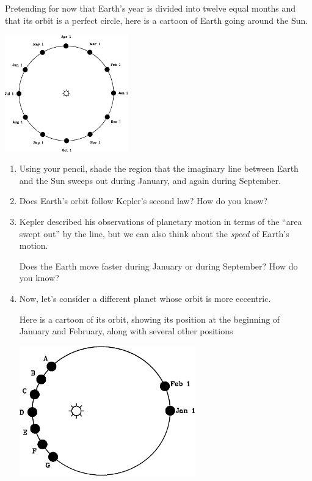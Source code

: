 \documentclass[12pt]{article}
\begin{document}
Pretending for now that Earth's year is divided into twelve equal months and that its orbit is a perfect circle, here is a cartoon of Earth going around the Sun.
\begin{center}
\includegraphics[width=0.4\textwidth]{earth-crop.pdf}
\end{center}
\begin{enumerate}
\item Using your pencil, shade the region that the imaginary line between Earth and the Sun sweeps out during January, and again during September.
\bigskip
\item Does Earth's orbit follow Kepler's second law? How do you know? 

\vspace{1.6in}

\item Kepler described his observations of planetary motion in terms of the ``area swept out'' by the line, but we can also think about the {\it speed} of Earth's motion.

Does the Earth move faster during January or during September? How do you know?

\newpage

\item Now, let's consider a different planet whose orbit is more eccentric. 

Here is a cartoon of its orbit, showing its position at the beginning of January and February, along with several other positions

\begin{center}
	\includegraphics[width=3in]{pick-one-crop.pdf}
	

\end{center}
\end{enumerate}
\end{document}
